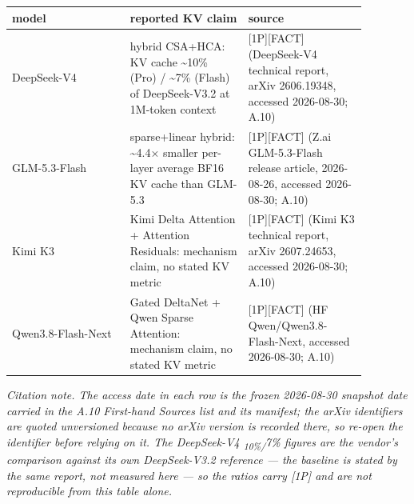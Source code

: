 \nopagebreak[4]
\begin{longtable}[]{@{}
  >{\raggedright\arraybackslash}p{0.2927\linewidth}
  >{\raggedright\arraybackslash}p{0.2927\linewidth}
  >{\raggedright\arraybackslash}p{0.2927\linewidth}@{}}
\toprule\noalign{}
\begin{minipage}[b]{\linewidth}\raggedright
model
\end{minipage} & \begin{minipage}[b]{\linewidth}\raggedright
reported KV claim
\end{minipage} & \begin{minipage}[b]{\linewidth}\raggedright
source
\end{minipage} \\
\midrule\noalign{}
\endhead
\bottomrule\noalign{}
\endlastfoot
DeepSeek-V4 & hybrid CSA+HCA: KV cache \textasciitilde10\% (Pro) /
\textasciitilde7\% (Flash) of DeepSeek-V3.2 at 1M-token context &
\mbox{{[}1P{]}}\hspace{0pt}\mbox{{[}FACT{]}} (DeepSeek-V4 technical report, arXiv 2606.19348,
accessed 2026-08-30; A.10) \\
\noalign{\label{tab:7.3}}
GLM-5.3-Flash & sparse+linear hybrid: \textasciitilde4.4× smaller
per-layer average BF16 KV cache than GLM-5.3 & \mbox{{[}1P{]}}\hspace{0pt}\mbox{{[}FACT{]}} (Z.ai
GLM-5.3-Flash release article, 2026-08-26, accessed 2026-08-30; A.10) \\
Kimi K3 & Kimi Delta Attention + Attention Residuals: mechanism claim,
no stated KV metric & \mbox{{[}1P{]}}\hspace{0pt}\mbox{{[}FACT{]}} (Kimi K3 technical report,
arXiv 2607.24653, accessed 2026-08-30; A.10) \\
Qwen3.8-Flash-Next & Gated DeltaNet + Qwen Sparse Attention: mechanism
claim, no stated KV metric & \mbox{{[}1P{]}}\hspace{0pt}\mbox{{[}FACT{]}} (HF
Qwen/Qwen3.8-Flash-Next, accessed 2026-08-30; A.10) \\
\end{longtable}

\emph{Citation note. The access date in each row is the frozen
2026-08-30 snapshot date carried in the A.10 First-hand Sources list and
its manifest; the arXiv identifiers are quoted unversioned because no
arXiv version is recorded there, so re-open the identifier before
relying on it. The DeepSeek-V4 \textsubscript{10\%/}7\% figures are the
vendor's comparison against its own DeepSeek-V3.2 reference --- the
baseline is stated by the same report, not measured here --- so the
ratios carry \mbox{{[}1P{]}} and are not reproducible from this table alone.}

